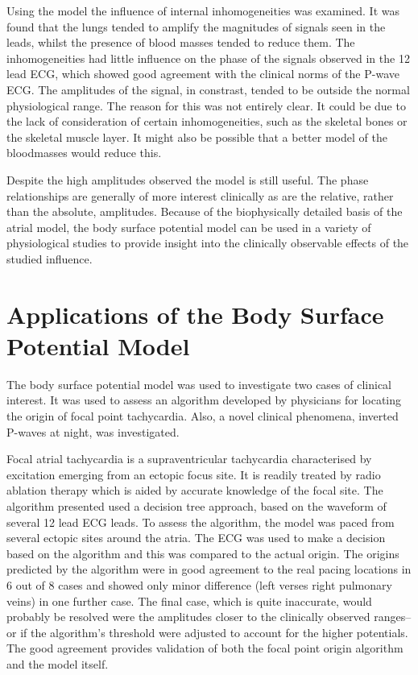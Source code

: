 Using the model the influence of internal inhomogeneities was examined.
It was found that the lungs tended to amplify the magnitudes of signals seen in
the leads, whilst the presence of blood masses tended to reduce them.
The inhomogeneities had little influence on the phase of the signals observed in
the 12 lead ECG, which showed good agreement with the clinical norms of the
P-wave ECG.
The amplitudes of the signal, in constrast, tended to be outside the normal
physiological range.
The reason for this was not entirely clear.
It could be due to the lack of consideration of certain inhomogeneities, such as
the skeletal bones or the skeletal muscle layer.
It might also be possible that a better model of the bloodmasses would reduce
this.

Despite the high amplitudes observed the model is still useful.
The phase relationships are generally of more interest clinically as are the
relative, rather than the absolute, amplitudes.
Because of the biophysically detailed basis of the atrial model, the body
surface potential model can be used in a variety of physiological studies to
provide insight into the clinically observable effects of the studied influence.

\section{Applications of the Body Surface Potential Model}

The body surface potential model was used to investigate two cases of clinical
interest.
It was used to assess an algorithm developed by physicians for locating the
origin of focal point tachycardia.
Also, a novel clinical phenomena, inverted P-waves at night, was investigated.

Focal atrial tachycardia is a supraventricular tachycardia characterised by
excitation emerging from an ectopic focus site.
It is readily treated by radio ablation therapy which is aided by accurate
knowledge of the focal site.
The algorithm presented used a decision tree approach, based on the waveform of
several 12 lead ECG leads.
To assess the algorithm, the model was paced from several ectopic sites around
the atria.
The ECG was used to make a decision based on the algorithm and this was compared
to the actual origin.
The origins predicted by the algorithm were in good agreement to the real pacing
locations in 6 out of 8 cases and showed only minor difference (left verses
right pulmonary veins) in one further case.
The final case, which is quite inaccurate, would probably be resolved were the
amplitudes closer to the clinically observed ranges--or if the algorithm's
threshold were adjusted to account for the higher potentials.
The good agreement provides validation of both the focal point origin algorithm
and the model itself.

